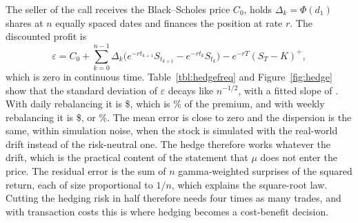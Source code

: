 The seller of the call receives the Black--Scholes price $C_0$, holds $\Delta_k=\Phi(d_1)$ shares at $n$ equally spaced dates and finances the position at rate $r$.
The discounted profit is
\begin{equation}\label{eq:hedgeerr}
 \varepsilon=C_0+\sum_{k=0}^{n-1}\Delta_k\big(e^{-rt_{k+1}}S_{t_{k+1}}-e^{-rt_k}S_{t_k}\big)-e^{-rT}(S_T-K)^+,
\end{equation}
which is zero in continuous time.
Table~\ref{tbl:hedgefreq} and Figure~\ref{fig:hedge} show that the standard deviation of $\varepsilon$ decays like $n^{-1/2}$, with a fitted slope of \HedgeSlope.
With daily rebalancing it is \$\HedgeSDdaily, which is \HedgeSDdailyPct\% of the premium, and with weekly rebalancing it is \$\HedgeSDweekly, or \HedgeSDweeklyPct\%.
The mean error is close to zero and the dispersion is the same, within simulation noise, when the stock is simulated with the real-world drift instead of the risk-neutral one.
The hedge therefore works whatever the drift, which is the practical content of the statement that $\mu$ does not enter the price.
The residual error is the sum of $n$ gamma-weighted surprises of the squared return, each of size proportional to $1/n$, which explains the square-root law.
Cutting the hedging risk in half therefore needs four times as many trades, and with transaction costs this is where hedging becomes a cost-benefit decision.
